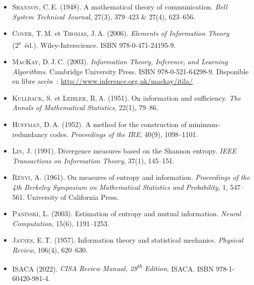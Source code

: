 \begin{itemize}

\item \textsc{Shannon}, C.\,E. (1948). A mathematical theory of communication.
\emph{Bell System Technical Journal}, 27(3), 379--423 \& 27(4), 623--656.

\item \textsc{Cover}, T.\,M. et \textsc{Thomas}, J.\,A. (2006).
\emph{Elements of Information Theory} (2\textsuperscript{e}~éd.).
Wiley-Interscience. ISBN 978-0-471-24195-9.

\item \textsc{MacKay}, D.\,J.\,C. (2003).
\emph{Information Theory, Inference, and Learning Algorithms}.
Cambridge University Press. ISBN 978-0-521-64298-9.
Disponible en libre accès~: \url{http://www.inference.org.uk/mackay/itila/}

\item \textsc{Kullback}, S. et \textsc{Leibler}, R.\,A. (1951).
On information and sufficiency.
\emph{The Annals of Mathematical Statistics}, 22(1), 79--86.

\item \textsc{Huffman}, D.\,A. (1952).
A method for the construction of minimum-redundancy codes.
\emph{Proceedings of the IRE}, 40(9), 1098--1101.

\item \textsc{Lin}, J. (1991).
Divergence measures based on the Shannon entropy.
\emph{IEEE Transactions on Information Theory}, 37(1), 145--151.

\item \textsc{Rényi}, A. (1961).
On measures of entropy and information.
\emph{Proceedings of the 4th Berkeley Symposium on Mathematical Statistics and
Probability}, 1, 547--561.
University of California Press.

\item \textsc{Paninski}, L. (2003).
Estimation of entropy and mutual information.
\emph{Neural Computation}, 15(6), 1191--1253.

\item \textsc{Jaynes}, E.\,T. (1957).
Information theory and statistical mechanics.
\emph{Physical Review}, 106(4), 620--630.

\item \textsc{ISACA} (2022).
\emph{CISA Review Manual, 28\textsuperscript{th} Edition}.
ISACA. ISBN 978-1-60420-981-4.

\end{itemize}

